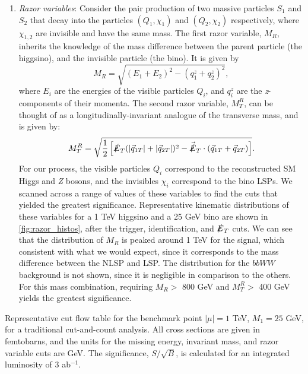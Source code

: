 \begin{enumerate}
\begin{marginfigure}
\centering
{}
\caption{Normalized distributions of the razor kinematical variables $M_R$ (top) and $M_T^R$ (bottom) for a 1 TeV higgsino NLSP and 25 GeV bino LSP}
\label{fig:razor_histos}
\end{marginfigure}
\item \emph{Razor variables}: Consider the pair production of two massive particles $S_1$ and $S_2$ that decay into the particles $(Q_1, \chi_1)$ and $(Q_2, \chi_2)$ respectively, where $\chi_{1,2}$ are invisible and have the same mass. The first razor variable, $M_{R}$, inherits the knowledge of the mass difference between the parent particle (the higgsino), and the invisible particle (the bino). It is given by
\[M_R = \sqrt{(E_1+E_2)^2 - (q_1^z + q_2^z)^2},\]
where $E_i$ are the energies of the visible particles $Q_i$, and $q_i^z$ are the \emph{z}-components of their momenta. 
The second razor variable, $M_{T}^{R}$, can be thought of as a longitudinally-invariant analogue of the transverse mass, and is given by:
\[M_T^R = \sqrt{\frac{1}{2}\left[\slashed{E}_T(|\vec{q}_{1T}|+|\vec{q}_{2T}|)^2 - \vec{\slashed{E}}_T\cdot(\vec{q}_{1T}+\vec{q}_{2T})\right]}.\]
For our process, the visible particles $Q_i$ correspond to the reconstructed SM Higgs and \emph{Z} bosons, and the invisibles $\chi_i$ correspond to the bino LSPs. We scanned across a range of values of these variables to find the cuts that yielded the greatest significance. Representative kinematic distributions of these variables for a 1 TeV higgsino and a 25 GeV bino are shown in \autoref{fig:razor_histos}, after the trigger, identification, and $\slashed{E}_{T}$ cuts. We can see that the distribution of $M_R$ is peaked around 1 TeV for the signal, which consistent with what we would expect, since it corresponds to the mass difference between the NLSP and LSP. The distribution for the $bbWW$ background is not shown, since it is negligible in comparison to the others.  For this mass combination, requiring $M_R >$ 800 GeV and $M_T^R >$ 400 GeV yields the greatest significance.
\end{enumerate}

\begin{table}
  \centering
\begin{adjustwidth*}{0in}{-0.8in}
  
  \caption{Representative cut flow table for the benchmark point $|\mu|=1$ TeV, $M_1 = 25$ GeV, for a traditional cut-and-count analysis. All cross sections are given in femtobarns, and the units for the missing energy, invariant mass, and razor variable cuts are GeV. The significance, $S/\sqrt{B}$, is calculated for an integrated luminosity of 3 ab$^{-1}$.}
\label{tab:cc_cutflowtable}
\end{adjustwidth*}
\end{table}

